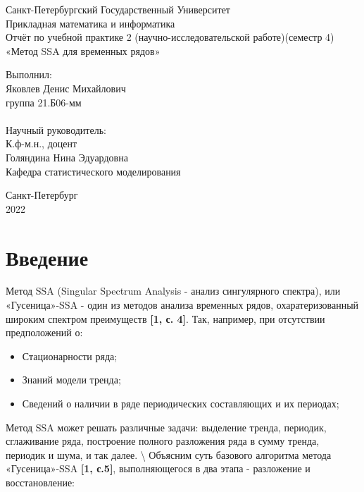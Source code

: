 \documentclass[
]{article}
\author{}
\date{\vspace{-2.5em}}
\begin{document}
\newcommand{\redline}{\hspace*{1cm}}
\thispagestyle{empty}
\begin{center}
Санкт-Петербургский Государственный Университет\\
Прикладная математика и информатика\\
\vspace*{50mm} Отчёт по учебной практике 2 (научно-исследовательской работе)(семестр 4)\\
«Метод SSA для временных рядов»
\end{center}
\vspace*{40mm}
\begin{flushright}
Выполнил:\\
Яковлев Денис Михайлович\\
группа 21.Б06-мм\\ \mbox{} \\
Научный руководитель:\\
К.ф-м.н., доцент\\
Голяндина Нина Эдуардовна\\
Кафедра статистического моделирования\\
\end{flushright}
\vspace*{30mm}
\begin{center}
\vspace*{30mm}
Санкт-Петербург\\
2022
\end{center}
\newpage
\thispagestyle{empty}
\tableofcontents
\newpage
{}

\section{Введение}

Метод SSA (Singular Spectrum Analysis - анализ сингулярного спектра),
или «Гусеница»-SSA - один из методов анализа временных рядов,
охаратеризованный широким спектром преимуществ \textbf{[1, с. 4]}. Так,
например, при отсутствии предположений о:

\begin{itemize}
    \item Стационарности ряда;
    \item Знаний модели тренда;
    \item Сведений о наличии в ряде периодических составляющих и их периодах;
\end{itemize}

Метод SSA может решать различные задачи: выделение тренда, периодик,
сглаживание ряда, построение полного разложения ряда в сумму тренда,
периодик и шума, и так далее. \textbackslash{} Объясним суть базового
алгоритма метода «Гусеница»-SSA \textbf{[1, с.5]}, выполняющегося в два
этапа - разложение и восстановление:
\end{document}
